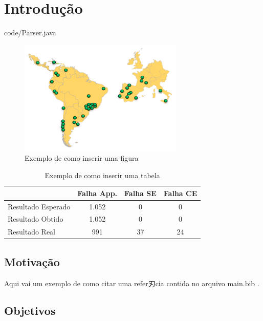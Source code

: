 \chapter{Introdução} \label{intro}

\lstset{language=Java}
 {code/Parser.java}

\begin{figure}
\centering
\caption{Exemplo de como inserir uma figura}\label{fig:eela}
\includegraphics[width=0.7\textwidth]{images/eela.png}
\end{figure}


\begin{table}
\centering
\caption{Exemplo de como inserir uma tabela}\label{tab:exp-app}
\begin{tabular}{ | l | c | c | c |}\hline
 				   & Falha App. & Falha SE & Falha CE\\\hline
Resultado Esperado & 1.052       & 0        & 0       \\\hline 
Resultado Obtido   & 1.052       & 0        & 0       \\\hline 
Resultado Real  & 991        & 37       & 24      \\\hline 
\end{tabular}
\end{table}


\section{Motivação}\label{sec:motiva}

Aqui vai um exemplo de como citar uma refer刃cia contida no arquivo main.bib \cite{nakada2007job}.

\section{Objetivos}

